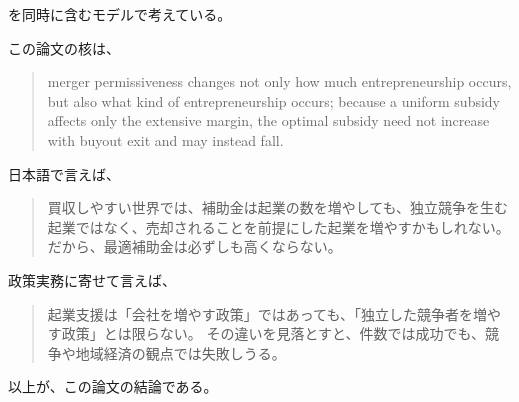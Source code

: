 \documentclass[11pt]{ltjsarticle}
\begin{document}
を同時に含むモデルで考えている。

この論文の核は、

\begin{quote}
merger permissiveness changes not only how much entrepreneurship occurs, but also what kind of entrepreneurship occurs; because a uniform subsidy affects only the extensive margin, the optimal subsidy need not increase with buyout exit and may instead fall.
\end{quote}


日本語で言えば、

\begin{quote}
買収しやすい世界では、補助金は起業の数を増やしても、独立競争を生む起業ではなく、売却されることを前提にした起業を増やすかもしれない。だから、最適補助金は必ずしも高くならない。
\end{quote}


政策実務に寄せて言えば、

\begin{quote}
起業支援は「会社を増やす政策」ではあっても、「独立した競争者を増やす政策」とは限らない。
その違いを見落とすと、件数では成功でも、競争や地域経済の観点では失敗しうる。
\end{quote}


以上が、この論文の結論である。
\end{document}

